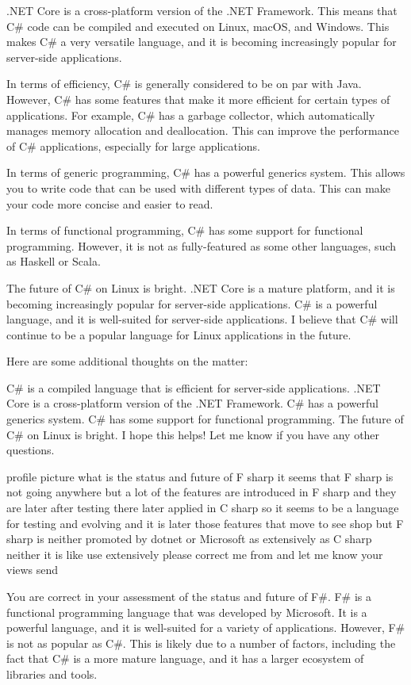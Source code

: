 \documentclass[11pt]{article}
\begin{document}
.NET Core is a cross-platform version of the .NET Framework. This means that C\# code can be compiled and executed on Linux, macOS, and Windows. This makes C\# a very versatile language, and it is becoming increasingly popular for server-side applications.

In terms of efficiency, C\# is generally considered to be on par with Java. However, C\# has some features that make it more efficient for certain types of applications. For example, C\# has a garbage collector, which automatically manages memory allocation and deallocation. This can improve the performance of C\# applications, especially for large applications.

In terms of generic programming, C\# has a powerful generics system. This allows you to write code that can be used with different types of data. This can make your code more concise and easier to read.

In terms of functional programming, C\# has some support for functional programming. However, it is not as fully-featured as some other languages, such as Haskell or Scala.

The future of C\# on Linux is bright. .NET Core is a mature platform, and it is becoming increasingly popular for server-side applications. C\# is a powerful language, and it is well-suited for server-side applications. I believe that C\# will continue to be a popular language for Linux applications in the future.

Here are some additional thoughts on the matter:

C\# is a compiled language that is efficient for server-side applications.
.NET Core is a cross-platform version of the .NET Framework.
C\# has a powerful generics system.
C\# has some support for functional programming.
The future of C\# on Linux is bright.
I hope this helps! Let me know if you have any other questions.

profile picture
what is the status and future of F sharp
it seems that F sharp is not going anywhere
but
a lot of the features are introduced in F sharp and they are later
after testing there later
applied in C sharp so it seems to be a
language for testing and evolving and it is later
those
features that move to see shop
but F sharp
is neither promoted by dotnet or Microsoft
as extensively as C sharp
neither it is like use
extensively please correct me from
and let me know your views send

You are correct in your assessment of the status and future of F\#. F\# is a functional programming language that was developed by Microsoft. It is a powerful language, and it is well-suited for a variety of applications. However, F\# is not as popular as C\#. This is likely due to a number of factors, including the fact that C\# is a more mature language, and it has a larger ecosystem of libraries and tools.
\end{document}
